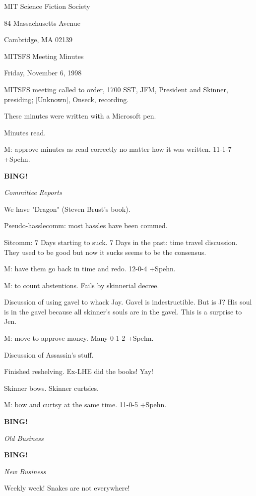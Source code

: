 \documentclass[12pt]{article}
\newcommand{\bing}{{\bf BING!} }
\newcommand{\goto}[1]{\bing \vskip 12pt \centerline{{\em{#1}}}}
\begin{document}
\begin{center}

MIT Science Fiction Society 

84 Massachusetts Avenue

Cambridge, MA 02139

\vspace{12pt}

MITSFS Meeting Minutes 

Friday, November 6, 1998

\end{center}
 
\vspace{18pt}

\setlength{\parskip}{6pt}

\noindent
MITSFS meeting called to order, 1700 SST,
JFM, President and Skinner, presiding; [Unknown], Onseck, recording.

These minutes were written with a Microsoft pen.

Minutes read.

M: approve minutes as read correctly no matter how it was written. 11-1-7 +Spehn.

\goto{Committee Reports}

We have "Dragon" (Steven Brust's book).

Pseudo-hasslecomm: most hassles have been commed.

Sitcomm: 7 Days starting to suck. 7 Days in the past: time travel discussion. They used to be good but now it sucks seems to be the consensus.

M: have them go back in time and redo. 12-0-4 +Spehn.

M: to count abstentions. Fails by skinnerial decree.

Discussion of using gavel to whack Jay. Gavel is indestructible. But is J? His soul is in the gavel because all skinner's souls are in the gavel. This is a surprise to Jen.

M: move to approve money. Many-0-1-2 +Spehn.

Discussion of Assassin's stuff.

Finished reshelving. Ex-LHE did the books! Yay!

Skinner bows. Skinner curtsies.

M: bow and curtsy at the same time. 11-0-5 +Spehn.

\goto{Old Business}

\goto{New Business}

Weekly week! Snakes are not everywhere!
\end{document}
